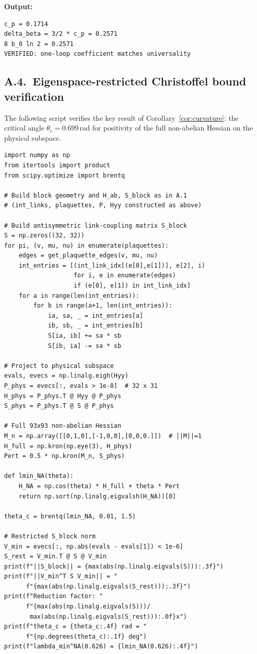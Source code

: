 \documentclass[11pt]{article}
\theoremstyle{definition}
\begin{document}
\noindent\textbf{Output:}
\begin{verbatim}
c_p = 0.1714
delta_beta = 3/2 * c_p = 0.2571
8 b_0 ln 2 = 0.2571
VERIFIED: one-loop coefficient matches universality
\end{verbatim}

\subsection*{A.4.~Eigenspace-restricted Christoffel bound verification}

The following script verifies the key result of
Corollary~\ref{cor:curvature}: the critical angle
$\theta_c=0.699$\,rad for positivity of the full non-abelian
Hessian on the physical subspace.

\begin{verbatim}
import numpy as np
from itertools import product
from scipy.optimize import brentq

# Build block geometry and H_ab, S_block as in A.1
# (int_links, plaquettes, P, Hyy constructed as above)

# Build antisymmetric link-coupling matrix S_block
S = np.zeros((32, 32))
for pi, (v, mu, nu) in enumerate(plaquettes):
    edges = get_plaquette_edges(v, mu, nu)
    int_entries = [(int_link_idx[(e[0],e[1])], e[2], i)
                   for i, e in enumerate(edges)
                   if (e[0], e[1]) in int_link_idx]
    for a in range(len(int_entries)):
        for b in range(a+1, len(int_entries)):
            ia, sa, _ = int_entries[a]
            ib, sb, _ = int_entries[b]
            S[ia, ib] += sa * sb
            S[ib, ia] -= sa * sb

# Project to physical subspace
evals, evecs = np.linalg.eigh(Hyy)
P_phys = evecs[:, evals > 1e-8]  # 32 x 31
H_phys = P_phys.T @ Hyy @ P_phys
S_phys = P_phys.T @ S @ P_phys

# Full 93x93 non-abelian Hessian
M_n = np.array([[0,1,0],[-1,0,0],[0,0,0.]])  # ||M||=1
H_full = np.kron(np.eye(3), H_phys)
Pert = 0.5 * np.kron(M_n, S_phys)

def lmin_NA(theta):
    H_NA = np.cos(theta) * H_full + theta * Pert
    return np.sort(np.linalg.eigvalsh(H_NA))[0]

theta_c = brentq(lmin_NA, 0.01, 1.5)

# Restricted S_block norm
V_min = evecs[:, np.abs(evals - evals[1]) < 1e-6]
S_rest = V_min.T @ S @ V_min
print(f"||S_block|| = {max(abs(np.linalg.eigvals(S))):.3f}")
print(f"||V_min^T S V_min|| = "
      f"{max(abs(np.linalg.eigvals(S_rest))):.3f}")
print(f"Reduction factor: "
      f"{max(abs(np.linalg.eigvals(S)))/
       max(abs(np.linalg.eigvals(S_rest))):.0f}x")
print(f"theta_c = {theta_c:.4f} rad = "
      f"{np.degrees(theta_c):.1f} deg")
print(f"lambda_min^NA(0.626) = {lmin_NA(0.626):.4f}")
\end{verbatim}
\end{document}
